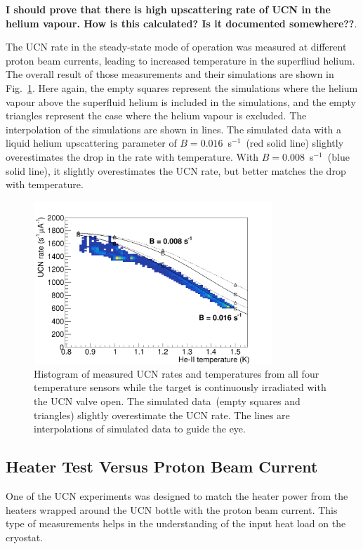 {\bf{I should prove that there is high upscattering rate of UCN in the
    helium vapour. How is this calculated? Is it documented somewhere??}}.




The UCN rate in the steady-state mode of operation was measured at
different proton beam currents, leading to increased temperature in
the superfliud helium. The overall result of those measurements and
their simulations are shown in Fig.~\ref{fig:rate_vs_temp_sim}. Here
again, the empty squares represent the simulations where the helium
vapour above the superfluid helium is included in the simulations, and
the empty triangles represent the case where the helium vapour is
excluded. The interpolation of the simulations are shown in lines. The
simulated data with a liquid helium upscattering parameter of
$B= 0.016$~s$^{-1}$~(red solid line) slightly overestimates the drop
in the rate with temperature. With $B= 0.008$~s$^{-1}$~(blue solid
line), it slightly overestimates the UCN rate, but better matches the
drop with temperature.


\begin{figure}[h!]
  \centering
  \includegraphics[width=0.8\textwidth]{rate_vs_Temp.pdf}
  \caption{Histogram of measured UCN rates and temperatures from all
    four temperature sensors while the target is continuously
    irradiated with the UCN valve open. The simulated data~(empty
    squares and triangles) slightly overestimate the UCN rate. The
    lines are interpolations of simulated data to guide the eye.}
  \label{fig:rate_vs_temp_sim}
\end{figure}


\subsection{Heater Test Versus Proton Beam Current}
One of the UCN experiments was designed to match the heater power from
the heaters wrapped around the UCN bottle with the proton beam
current. This type of measurements helps in the understanding of the
input heat load on the cryostat.

